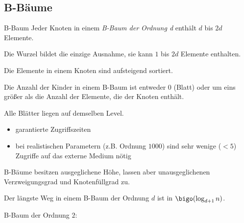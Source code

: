 \subsection{B-Bäume}

\begin{defi}{B-Baum}
    Jeder Knoten in einem \emph{B-Baum der Ordnung d} enthält $d$ bis $2d$ Elemente.

    Die Wurzel bildet die einzige Ausnahme, sie kann $1$ bis $2d$ Elemente enthalten.

    Die Elemente in einem Knoten sind aufsteigend sortiert.

    Die Anzahl der Kinder in einem B-Baum ist entweder $0$ (Blatt) oder um eins größer als die Anzahl der Elemente, die der Knoten enthält.

    Alle Blätter liegen auf demselben Level.
    \begin{itemize}[-]
        \item garantierte Zugriffszeiten
        \item bei realistischen Parametern (z.B. Ordnung $1000$) sind sehr wenige ($<5$) Zugriffe auf das externe Medium nötig
    \end{itemize}

    B-Bäume besitzen ausgeglichene Höhe, lassen aber unausgeglichenen Verzweigungsgrad und Knotenfüllgrad zu.

    Der längste Weg in einem B-Baum der Ordnung $d$ ist in $\bigo(\log_{d+1} n)$.

    B-Baum der Ordnung $2$:
    \vspace{1em}


\end{defi}
